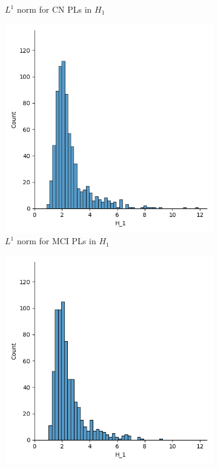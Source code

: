 \documentclass{article}
\begin{document}
\begin{figure}
\begin{subfigure}{0.32\textwidth}
    \caption{$L^1$ norm for CN PLs in $H_1$}
  \end{subfigure}
  \begin{subfigure}{0.32\textwidth}
    \includegraphics[width=\textwidth]{figures/median_pls/median_pl_MCI_H_1.png}
    \caption{$L^1$ norm for MCI PLs in $H_1$}
  \end{subfigure}
  \begin{subfigure}{0.32\textwidth}
    \includegraphics[width=\textwidth]{figures/median_pls/median_pl_AD_H_1.png}

\end{subfigure}
\end{figure}
\end{document}
